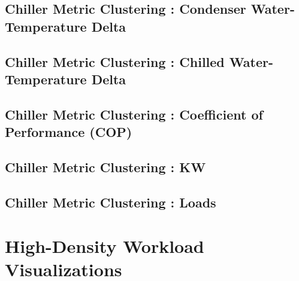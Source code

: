 \documentclass{report}
\begin{document}
\chapter{Chiller Metric Clustering : Condenser Water-Temperature Delta}

\chapter{Chiller Metric Clustering : Chilled Water-Temperature Delta}

\chapter{Chiller Metric Clustering : Coefficient of Performance (COP)}

\chapter{Chiller Metric Clustering : KW}

\chapter{Chiller Metric Clustering : Loads}

\part{High-Density Workload Visualizations}
\end{document}
